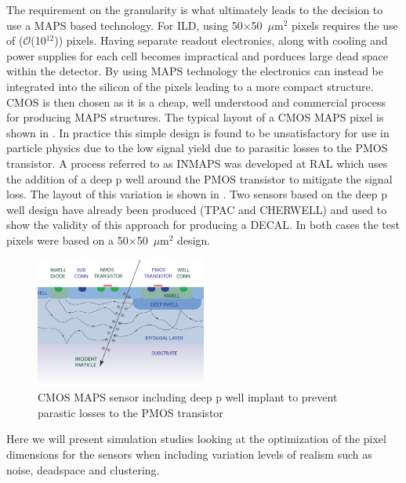 The requirement on the granularity is what ultimately leads to the decision to use a \ac{MAPS} based technology. For \ac{ILD}, using 50$\times$50~$\mu$m$^2$ pixels requires the use of ($\mathcal{O}$(10$^{12}$)) pixels. Having separate readout electronics, along with cooling and power supplies for each cell becomes impractical and porduces large dead space within the detector. By using \ac{MAPS} technology the electronics can instead be integrated into the silicon of the pixels leading to a more compact structure. \ac{CMOS} is then chosen as it is a cheap, well understood and commercial process for producing \ac{MAPS} structures. The typical layout of a \ac{CMOS} \ac{MAPS} pixel is shown in . In practice this simple design is found to be unsatisfactory for use in particle physics due to the low signal yield due to parasitic losses to the PMOS transistor. A process referred to as INMAPS was developed at \ac{RAL}\cite{2008arXiv0807.2920B} which uses the addition of a deep p well around the PMOS transistor to mitigate the signal loss. The layout of this variation is shown in . Two sensors based on the deep p well design have already been produced (TPAC\cite{Ballin:2008rha} and CHERWELL\cite{MYLROIESMITH2013137}) and used to show the validity of this approach for producing a \ac{DECAL}\cite{Price:2013js}. In both cases the test pixels were based on a 50$\times$50~$\mu$m$^2$ design.


\begin{figure}
  \centering
  \includegraphics[width=0.5\textwidth,keepaspectratio]{DECALStudies/fig/deeppwell}
  \caption{\ac{CMOS} \ac{MAPS} sensor including deep p well implant to prevent parastic losses to the PMOS transistor\cite{MYLROIESMITH2013137}}
  \label{fig:deeppwell}
\end{figure}

Here we will present simulation studies looking at the optimization of the pixel dimensions for the sensors when including variation levels of realism such as noise, deadspace and clustering.  

